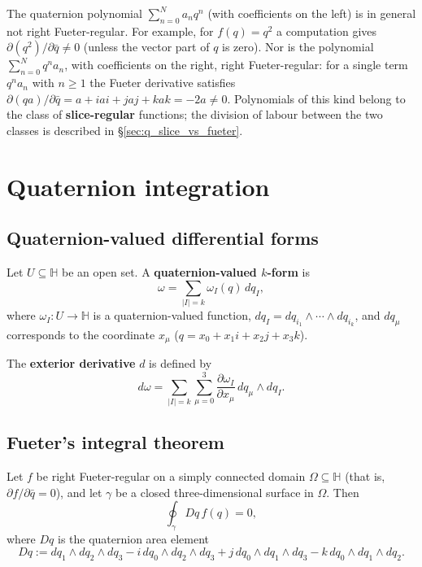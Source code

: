 \begin{remark}\label{rem:q_polynomial_not_regular}
The quaternion polynomial $\sum_{n=0}^N a_n q^n$ (with coefficients on the left) is in general not right Fueter-regular. For example, for $f(q)=q^2$ a computation gives $\partial(q^2)/\partial\bar q\neq 0$ (unless the vector part of $q$ is zero). Nor is the polynomial $\sum_{n=0}^N q^n a_n$, with coefficients on the right, right Fueter-regular: for a single term $q^n a_n$ with $n\ge 1$ the Fueter derivative satisfies $\partial(qa)/\partial\bar q=a+iai+jaj+kak=-2a\neq 0$. Polynomials of this kind belong to the class of \textbf{slice-regular} functions; the division of labour between the two classes is described in \S\ref{sec:q_slice_vs_fueter}.
\end{remark}

\section{Quaternion integration}

\subsection{Quaternion-valued differential forms}

\begin{definition}\label{def:q_differential_forms}
Let $U\subseteq\mathbb{H}$ be an open set. A \textbf{quaternion-valued $k$-form} is
\[
\omega=\sum_{|I|=k} \omega_I(q)\,dq_I,
\]
where $\omega_I:U\to\mathbb{H}$ is a quaternion-valued function, $dq_I=dq_{i_1}\wedge\cdots\wedge dq_{i_k}$, and $dq_\mu$ corresponds to the coordinate $x_\mu$ ($q=x_0+x_1i+x_2j+x_3k$).
\end{definition}

\begin{definition}\label{def:q_exterior_derivative}
The \textbf{exterior derivative} $d$ is defined by
\[
d\omega=\sum_{|I|=k}\sum_{\mu=0}^3 \frac{\partial \omega_I}{\partial x_\mu}\,dq_\mu\wedge dq_I.
\]
\end{definition}

\subsection{Fueter's integral theorem}

\begin{theorem}\label{thm:q_cauchy_fueter}
Let $f$ be right Fueter-regular on a simply connected domain $\Omega\subseteq\mathbb{H}$ (that is, $\partial f/\partial \bar q=0$), and let $\gamma$ be a closed three-dimensional surface in $\Omega$. Then
\[
\oint_\gamma Dq\,f(q)=0,
\]
where $Dq$ is the quaternion area element
\[
Dq:=dq_1\wedge dq_2\wedge dq_3
-i\,dq_0\wedge dq_2\wedge dq_3
+j\,dq_0\wedge dq_1\wedge dq_3
-k\,dq_0\wedge dq_1\wedge dq_2.
\]
\end{theorem}

